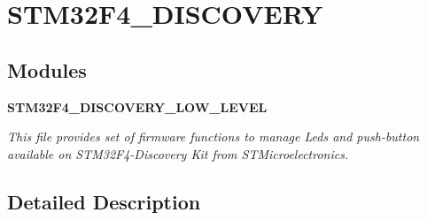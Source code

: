 \section{S\+T\+M32\+F4\+\_\+\+D\+I\+S\+C\+O\+V\+E\+RY}
\label{group__STM32F4__DISCOVERY}
\subsection*{Modules}
\begin{DoxyCompactItemize}
\item 
\textbf{ S\+T\+M32\+F4\+\_\+\+D\+I\+S\+C\+O\+V\+E\+R\+Y\+\_\+\+L\+O\+W\+\_\+\+L\+E\+V\+EL}
\begin{DoxyCompactList}\small\item\em This file provides set of firmware functions to manage Leds and push-\/button available on S\+T\+M32\+F4-\/\+Discovery Kit from S\+T\+Microelectronics. \end{DoxyCompactList}\end{DoxyCompactItemize}


\subsection{Detailed Description}
